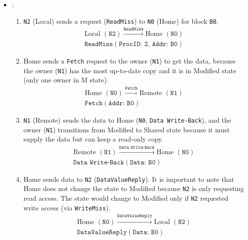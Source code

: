 \begin{itemize}
    \item {}:
    \begin{enumerate}
        \item \texttt{N2} (Local) sends a request (\texttt{ReadMiss}) to \texttt{N0} (Home) for block \texttt{B0}.
        \begin{gather*}
            \text{Local } (\texttt{N2}) \xrightarrow{\texttt{ReadMiss}} \text{Home } (\texttt{N0})
            \\[.3em]
            \texttt{ReadMiss}(\texttt{ProcID: 2, Addr: B0})
        \end{gather*}

        \item Home sends a \texttt{Fetch} request to the owner (\texttt{N1}) to get the data, because the owner (\texttt{N1}) has the most up-to-date copy and it is in Modified state (only one owner in M state).
        \begin{gather*}
            \text{Home } (\texttt{N0}) \xrightarrow{\texttt{Fetch}} \text{Remote } (\texttt{N1})
            \\[.3em]
            \texttt{Fetch}(\texttt{Addr: B0})
        \end{gather*}

        \item \texttt{N1} (Remote) sends the data to Home (\texttt{N0}, \texttt{Data Write-Back}), and the owner (\texttt{N1}) transitions from Modified to Shared state because it must supply the data but can keep a read-only copy.
        \begin{gather*}
            \text{Remote } (\texttt{N1}) \xrightarrow{\texttt{Data Write-Back}} \text{Home } (\texttt{N0})
            \\[.3em]
            \texttt{Data Write-Back}(\texttt{Data: B0})
        \end{gather*}

        \item Home sends data to \texttt{N2} (\texttt{DataValueReply}). It is important to note that Home does not change the state to Modified because \texttt{N2} is only requesting read access. The state would change to Modified only if \texttt{N2} requested write access (via \texttt{WriteMiss}).
        \begin{gather*}
            \text{Home } (\texttt{N0}) \xrightarrow{\texttt{DataValueReply}} \text{Local } (\texttt{N2})
            \\[.3em]
            \texttt{DataValueReply}(\texttt{Data: B0})
        \end{gather*}


\end{enumerate}
\end{itemize}
